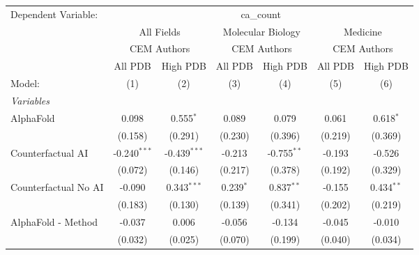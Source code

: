 \begingroup
\centering
\begin{tabular}{lcccccc}
   \tabularnewline \midrule \midrule
   Dependent Variable: & \multicolumn{6}{c}{ca\_count}\\
 & \multicolumn{2}{c}{All Fields} & \multicolumn{2}{c}{Molecular Biology} & \multicolumn{2}{c}{Medicine} \\
\cmidrule(lr){2-3} \cmidrule(lr){4-5} \cmidrule(lr){6-7}
 & \multicolumn{2}{c}{CEM Authors} & \multicolumn{2}{c}{CEM Authors} & \multicolumn{2}{c}{CEM Authors} \\
\cmidrule(lr){2-3} \cmidrule(lr){4-5} \cmidrule(lr){6-7}
 & \multicolumn{1}{c}{All PDB} & \multicolumn{1}{c}{High PDB} & \multicolumn{1}{c}{All PDB} & \multicolumn{1}{c}{High PDB} & \multicolumn{1}{c}{All PDB} & \multicolumn{1}{c}{High PDB} \\
\cmidrule(lr){2-2} \cmidrule(lr){3-3} \cmidrule(lr){4-4} \cmidrule(lr){5-5} \cmidrule(lr){6-6} \cmidrule(lr){7-7}
   Model:                                                     & (1)            & (2)            & (3)          & (4)           & (5)     & (6)\\  
   \midrule
   \emph{Variables}\\
   AlphaFold                                                  & 0.098          & 0.555$^{*}$    & 0.089        & 0.079         & 0.061   & 0.618$^{*}$\\   
                                                              & (0.158)        & (0.291)        & (0.230)      & (0.396)       & (0.219) & (0.369)\\   
   Counterfactual AI                                          & -0.240$^{***}$ & -0.439$^{***}$ & -0.213       & -0.755$^{**}$ & -0.193  & -0.526\\   
                                                              & (0.072)        & (0.146)        & (0.217)      & (0.378)       & (0.192) & (0.329)\\   
   Counterfactual No AI                                       & -0.090         & 0.343$^{***}$  & 0.239$^{*}$  & 0.837$^{**}$  & -0.155  & 0.434$^{**}$\\   
                                                              & (0.183)        & (0.130)        & (0.139)      & (0.341)       & (0.202) & (0.219)\\   
   AlphaFold - Method                                         & -0.037         & 0.006          & -0.056       & -0.134        & -0.045  & -0.010\\   
                                                              & (0.032)        & (0.025)        & (0.070)      & (0.199)       & (0.040) & (0.034)\\   

\end{tabular}
